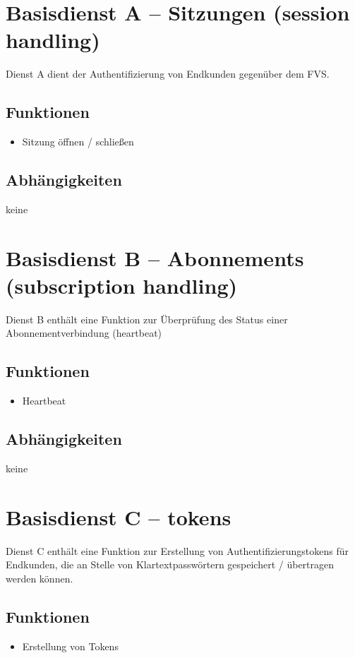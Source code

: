 \section{Basisdienst A -- Sitzungen (session handling)}
\label{sec:Hierachiemodell:BasisdientA}
Dienst A dient der Authentifizierung von Endkunden gegenüber dem FVS.

\subsection*{Funktionen}
\begin{itemize}
\item Sitzung öffnen / schließen
\end{itemize}

\subsection*{Abhängigkeiten}
keine

\section{Basisdienst B -- Abonnements (subscription handling)}
\label{sec:Hierachiemodell:BasisdientB}
Dienst B enthält eine Funktion zur Überprüfung des Status einer Abonnementverbindung (heartbeat)

\subsection*{Funktionen}
\begin{itemize}
\item Heartbeat
\end{itemize}

\subsection*{Abhängigkeiten}
keine

\section{Basisdienst C -- tokens}
\label{sec:Hierachiemodell:BasisdienstC}
Dienst C enthält eine Funktion zur Erstellung von Authentifizierungstokens für Endkunden, die an Stelle von Klartextpasswörtern gespeichert / übertragen werden können.

\subsection*{Funktionen}
\begin{itemize}
\item Erstellung von Tokens
\end{itemize}

